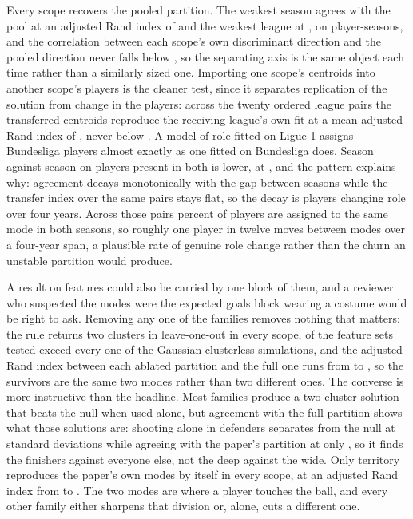 Every scope recovers the pooled partition. The weakest season agrees with the pool at an adjusted
Rand index of \RepSeasonPooledMin{} and the weakest league at \RepLeaguePooledMin{}, on \RepN{}
player-seasons, and the correlation between each scope's own discriminant direction and the pooled
direction never falls below \RepAxisCorrMin{}, so the separating axis is the same object each time
rather than a similarly sized one. Importing one scope's centroids into another scope's players is
the cleaner test, since it separates replication of the solution from change in the players:
across the twenty ordered league pairs the transferred centroids reproduce the receiving league's
own fit at a mean adjusted Rand index of \RepTransferMean{}, never below \RepTransferMin{}. A
model of role fitted on Ligue 1 assigns Bundesliga players almost exactly as one fitted on
Bundesliga does. Season against season on players present in both is lower, at \RepPairMean{}, and
the pattern explains why: agreement decays monotonically with the gap between seasons while the
transfer index over the same pairs stays flat, so the decay is players changing role over four
years. Across those pairs \RepShareMean{} percent of players are assigned to the same mode in both
seasons, so roughly one player in twelve moves between modes over a four-year span, a plausible
rate of genuine role change rather than the churn an unstable partition would produce.

A result on \ArcFeatures{} features could also be carried by one block of them, and a reviewer who
suspected the modes were the expected goals block wearing a costume would be right to ask.
Removing any one of the \AblFamiliesWord{} families removes nothing that matters: the rule returns two
clusters in \AblSurvivesAll{} leave-one-out in every scope, \AblCellsBeatNull{} of the
\AblCells{} feature sets tested exceed every one of the \AblSimulations{} Gaussian clusterless
simulations,
and the adjusted Rand index between each ablated partition and the full one runs from
\AblLeaveARIMin{} to \AblLeaveARIMax{}, so the survivors are the same two modes rather than two
different ones. The converse is more instructive than the headline. Most families produce a
two-cluster solution that beats the null when used alone, but agreement with the full partition
shows what those solutions are: shooting alone in defenders separates from the null at
\AblKeepZShootingDF{} standard deviations while agreeing with the paper's partition at only
\AblKeepARIShootingDF{}, so it finds the finishers against everyone else, not the deep against the
wide. Only territory reproduces the paper's own modes by itself in every scope, at an adjusted
Rand index from \AblTerritoryARIMin{} to \AblTerritoryARIMax{}. The two modes are where a player
touches the ball, and every other family either sharpens that division or, alone, cuts a different
one.

